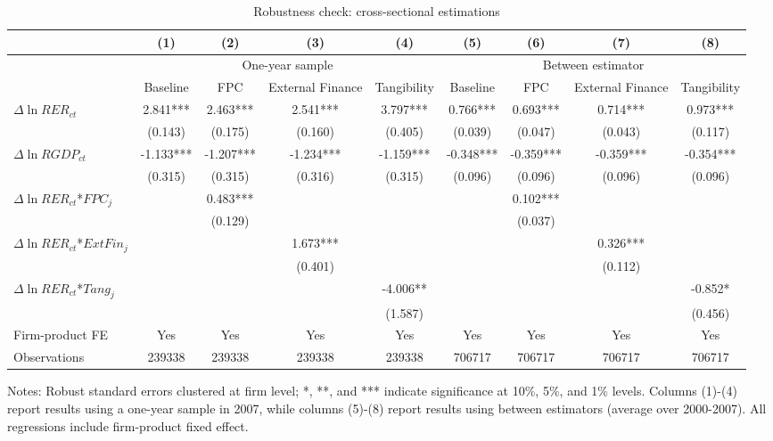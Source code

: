 \begin{table}
	\centering
	\caption{Robustness check: cross-sectional estimations}
	\begin{threeparttable}
		\begin{tabular}{lcccccccc}
			\toprule
			& (1)   & (2)   & (3)   & (4) &  (5)  &  (6)  & (7)  & (8)\\
			\midrule
			& \multicolumn{4}{c}{One-year sample} & \multicolumn{4}{c}{Between estimator}\\
			& Baseline & FPC   & External Finance & Tangibility & Baseline & FPC & External Finance & Tangibility\\
			\midrule
			$\Delta \ln RER_{ct}$ & 2.841*** & 2.463*** & 2.541*** & 3.797*** & 0.766*** & 0.693*** & 0.714*** & 0.973*** \\
			& (0.143) & (0.175) & (0.160) & (0.405) & (0.039) & (0.047) & (0.043) & (0.117) \\
			$\Delta \ln RGDP_{ct}$ & -1.133*** & -1.207*** & -1.234*** & -1.159*** & -0.348*** & -0.359*** & -0.359*** & -0.354*** \\
			& (0.315) & (0.315) & (0.316) & (0.315) & (0.096) & (0.096) & (0.096) & (0.096) \\
			$\Delta \ln RER_{ct}$*$FPC_{j}$ &   & 0.483*** &       &       &       & 0.102*** &       &  \\
			&   & (0.129) &       &       &       & (0.037) &       &  \\
			$\Delta \ln RER_{ct}$*$ExtFin_{j}$ &   &       & 1.673*** &       &       &       & 0.326*** &  \\
			&  &       & (0.401) &       &       &       & (0.112) &  \\
			$\Delta \ln RER_{ct}$*$Tang_{j}$ &   &       &       & -4.006** &       &       &       & -0.852* \\
			&   &       &       & (1.587) &       &       &       & (0.456) \\
			Firm-product FE &  Yes   & Yes   & Yes   & Yes &Yes   & Yes   & Yes   & Yes\\
			Observations & 239338 & 239338 & 239338 & 239338 & 706717 & 706717 & 706717 & 706717 \\
			\bottomrule
		\end{tabular}
		\begin{tablenotes}
			\footnotesize
			\item[Notes:] Robust standard errors clustered at firm level; *, **, and *** indicate significance at 10\%, 5\%, and 1\% levels. Columns (1)-(4) report results using a one-year sample in 2007, while columns (5)-(8) report results using between estimators (average over 2000-2007). All regressions include firm-product fixed effect.
		\end{tablenotes}
	\end{threeparttable}
	\label{tab.robust.crosec}
\end{table}

